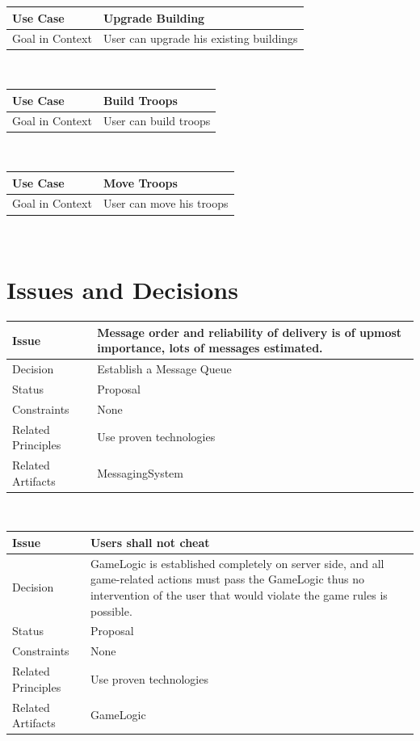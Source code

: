 \documentclass[a4paper]{article}
\begin{document}
\begin{tabular}[t]{|l|l|l|}
\hline
\textbf{Use Case}	&	\multicolumn{2}{|l|}{\textbf{Upgrade Building}}\\
\hline
Goal in Context	&	\multicolumn{2}{|l|}{User can upgrade his existing buildings}\\
\hline
\end{tabular}\\

\begin{tabular}[t]{|l|l|l|}
\hline
\textbf{Use Case}	&	\multicolumn{2}{|l|}{\textbf{Build Troops}}\\
\hline
Goal in Context	&	\multicolumn{2}{|l|}{User can build troops}\\
\hline
\end{tabular}\\

\begin{tabular}[t]{|l|l|l|}
\hline
\textbf{Use Case}	&	\multicolumn{2}{|l|}{\textbf{Move Troops}}\\
\hline
Goal in Context	&	\multicolumn{2}{|l|}{User can move his troops}\\
\hline
\end{tabular}\\

\clearpage

\section{Issues and Decisions}

\begin{tabular}[t]{|l|p{10cm}|}
\hline
\textbf{Issue}	&	Message order and reliability of delivery is of upmost importance, lots of messages estimated.\\
\hline
Decision	&	Establish a Message Queue\\
\hline
Status	& Proposal\\
\hline
Constraints	&	None\\
\hline
Related Principles	&	Use proven technologies\\
\hline
Related Artifacts	&	MessagingSystem\\
\hline
\end{tabular}\\

\begin{tabular}[t]{|l|p{10cm}|}
\hline
\textbf{Issue}	&	Users shall not cheat\\
\hline
Decision	&	GameLogic is established completely on server side, and all game-related actions must pass the GameLogic thus no intervention of the user that would violate the game rules is possible.\\
\hline
Status	& Proposal\\
\hline
Constraints	&	None\\
\hline
Related Principles	&	Use proven technologies\\
\hline
Related Artifacts	&	GameLogic\\
\hline
\end{tabular}\\
\end{document}
